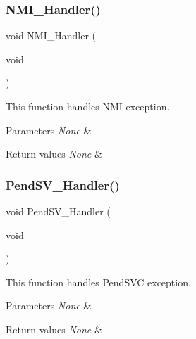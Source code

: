 \subsubsection{\texorpdfstring{N\+M\+I\+\_\+\+Handler()}{NMI\_Handler()}}
{\footnotesize\ttfamily void N\+M\+I\+\_\+\+Handler (\begin{DoxyParamCaption}\item[{void}]{ }\end{DoxyParamCaption})}



This function handles N\+MI exception. 


\begin{DoxyParams}{Parameters}
{\em None} & \\
\hline
\end{DoxyParams}

\begin{DoxyRetVals}{Return values}
{\em None} & \\
\hline
\end{DoxyRetVals}
\mbox{\label{group___templates_ga6303e1f258cbdc1f970ce579cc015623}} 
\subsubsection{\texorpdfstring{Pend\+S\+V\+\_\+\+Handler()}{PendSV\_Handler()}}
{\footnotesize\ttfamily void Pend\+S\+V\+\_\+\+Handler (\begin{DoxyParamCaption}\item[{void}]{ }\end{DoxyParamCaption})}



This function handles Pend\+S\+VC exception. 


\begin{DoxyParams}{Parameters}
{\em None} & \\
\hline
\end{DoxyParams}

\begin{DoxyRetVals}{Return values}
{\em None} & \\
\hline
\end{DoxyRetVals}
\mbox{\label{group___templates_ga3e5ddb3df0d62f2dc357e64a3f04a6ce}} 
